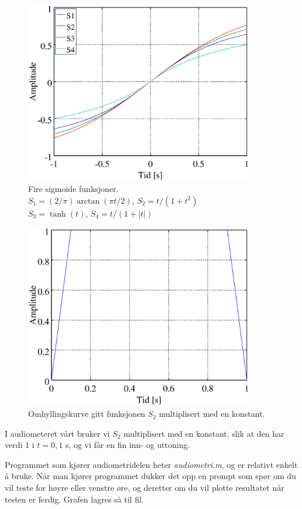 \documentclass[norsk, twocolumn,letterpaper,11pt,fleqn]{extarticle}
\begin{document}
\begin{figure}[h!]
	\centering
	\includegraphics[width=100mm]{sigmoidsammenligning.eps}
	\caption[]{Fire sigmoide funksjoner.\\$S_1=(2/\pi)\arctan(\pi t/2)$, $S_2=t/(1+t^2)$\\ 
		$S_3=\tanh(t)$, $S_4=t/(1+|t|)$}
	\label{fig:1}
\end{figure}
\begin{figure}[h!]
	\centering
	\includegraphics[width=100mm]{omhyll.eps}
	\caption[]{Omhyllingskurve gitt funksjonen $S_2$ multiplisert med en konstant.}
	\label{fig:2}
\end{figure}

I audiometeret vårt bruker vi $S_2$ multiplisert med en konstant, 
slik at den har verdi $1$ i $t=0{,}1$ s, og vi får en fin inn- og uttoning.

Programmet som kjører audiometridelen heter \textit{audiometri.m}, og
er relativt enkelt å bruke. Når man kjører programmet dukker det opp en prompt som
spør om du vil teste for høyre eller venstre øre, og deretter om du vil plotte
resultatet når testen er ferdig. Grafen lagres så til fil.
\end{document}

